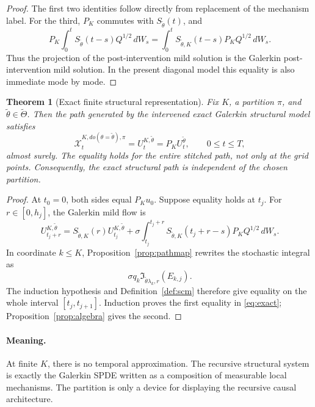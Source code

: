 \documentclass[11pt]{article}
\newtheorem{theorem}[assumption]{Theorem}
\theoremstyle{remark}
\newcommand{\1}{\mathbf 1}
\newcommand{\ThetaI}{\widetilde\Theta}
\begin{document}
\begin{proof}
The first two identities follow directly from replacement of the mechanism label.  For the third, \(P_K\) commutes with \(S_{\widetilde\theta}(t)\), and
\[
 P_K\int_0^tS_{\widetilde\theta}(t-s)Q^{1/2}\,dW_s
 =\int_0^tS_{\widetilde\theta,K}(t-s)P_KQ^{1/2}\,dW_s.
\]
Thus the projection of the post-intervention mild solution is the Galerkin post-intervention mild solution.  In the present diagonal model this equality is also immediate mode by mode.
\end{proof}

\begin{theorem}[Exact finite structural representation]\label{thm:exact}
Fix \(K\), a partition \(\pi\), and \(\widetilde\theta\in\ThetaI\).  Then the path generated by the intervened exact Galerkin structural model satisfies
\begin{equation}\label{eq:exact}
  \mathcal X_t^{K,do(\theta=\widetilde\theta),\pi}
  =U_t^{K,\widetilde\theta}
  =P_KU_t^{\widetilde\theta},
  \qquad 0\le t\le T,
\end{equation}
almost surely.  The equality holds for the entire stitched path, not only at the grid points.  Consequently, the exact structural path is independent of the chosen partition.
\end{theorem}

\begin{proof}
At \(t_0=0\), both sides equal \(P_Ku_0\).  Suppose equality holds at \(t_j\).  For \(r\in[0,h_j]\), the Galerkin mild flow is
\[
 U_{t_j+r}^{K,\widetilde\theta}
 =S_{\widetilde\theta,K}(r)U_{t_j}^{K,\widetilde\theta}
  +\sigma\int_{t_j}^{t_j+r}
  S_{\widetilde\theta,K}(t_j+r-s)P_KQ^{1/2}\,dW_s.
\]
In coordinate \(k\le K\), Proposition~\ref{prop:pathmap} rewrites the stochastic integral as
\[
 \sigma q_k\mathfrak I_{\widetilde\theta\lambda_k,r}(E_{k,j}).
\]
The induction hypothesis and Definition~\ref{def:scm} therefore give equality on the whole interval \([t_j,t_{j+1}]\).  Induction proves the first equality in \eqref{eq:exact}; Proposition~\ref{prop:algebra} gives the second.
\end{proof}

\paragraph{Meaning.}
At finite \(K\), there is no temporal approximation.  The recursive structural system is exactly the Galerkin SPDE written as a composition of measurable local mechanisms.  The partition is only a device for displaying the recursive causal architecture.
\end{document}
